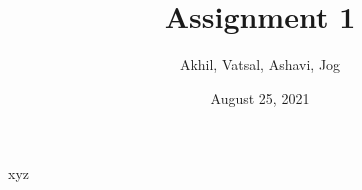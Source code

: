\documentclass[a4paper,12pt]{article}
\begin{document}
\title{Assignment 1}
\author{Akhil, Vatsal, Ashavi, Jog}
\date{August 25, 2021}
\maketitle

\newpage

xyz
\end{document}
